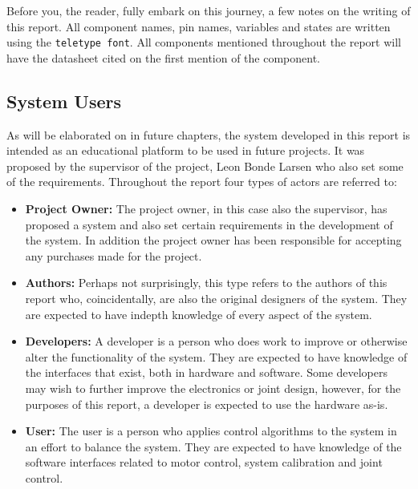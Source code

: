 Before you, the reader, fully embark on this journey, a few notes on the writing of this report. 
All component names, pin names, variables and states are written using the \texttt{teletype font}.
All components mentioned throughout the report will have the datasheet cited on the first mention of the component.

\subsection{System Users} %
\label{sub:system_users}
As will be elaborated on in future chapters, the system developed in this report is intended as an educational platform to be used in future projects.
It was proposed by the supervisor of the project, Leon Bonde Larsen who also set some of the requirements.
Throughout the report four types of actors are referred to:
\begin{itemize}
	\item \textbf{Project Owner:} The project owner, in this case also the supervisor, has proposed a system and also set certain requirements in the development of the system.
	In addition the project owner has been responsible for accepting any purchases made for the project. 
	\item \textbf{Authors:} Perhaps not surprisingly, this type refers to the authors of this report who, coincidentally, are also the original designers of the system.
	They are expected to have indepth knowledge of every aspect of the system.
	\item \textbf{Developers:} A developer is a person who does work to improve or otherwise alter the functionality of the system.
	They are expected to have knowledge of the interfaces that exist, both in hardware and software.
	Some developers may wish to further improve the electronics or joint design, however, for the purposes of this report, a developer is expected to use the hardware as-is.
	\item \textbf{User:} The user is a person who applies control algorithms to the system in an effort to balance the system.
	They are expected to have knowledge of the software interfaces related to motor control, system calibration and joint control.
\end{itemize}

